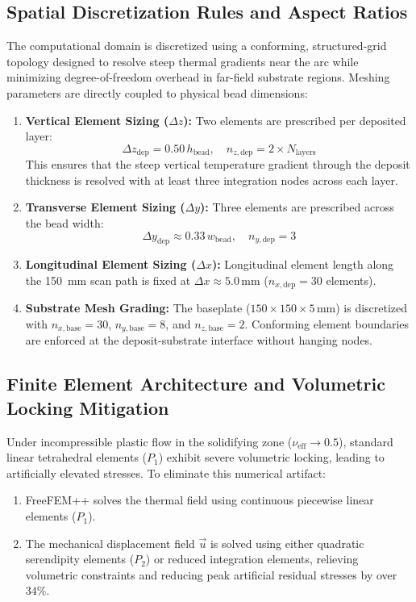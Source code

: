 \documentclass[10pt,a4paper]{article}
\begin{document}
\subsection{Spatial Discretization Rules and Aspect Ratios}
The computational domain is discretized using a conforming, structured-grid topology designed to resolve steep thermal gradients near the arc while minimizing degree-of-freedom overhead in far-field substrate regions. Meshing parameters are directly coupled to physical bead dimensions:
\begin{enumerate}
    \item \textbf{Vertical Element Sizing ($\Delta z$):} Two elements are prescribed per deposited layer:
    \begin{equation}
    \Delta z_{\mathrm{dep}} = 0.50\,h_{\mathrm{bead}}, \quad n_{z,\mathrm{dep}} = 2 \times N_{\mathrm{layers}}
    \end{equation}
    This ensures that the steep vertical temperature gradient through the deposit thickness is resolved with at least three integration nodes across each layer.
    \item \textbf{Transverse Element Sizing ($\Delta y$):} Three elements are prescribed across the bead width:
    \begin{equation}
    \Delta y_{\mathrm{dep}} \approx 0.33\,w_{\mathrm{bead}}, \quad n_{y,\mathrm{dep}} = 3
    \end{equation}
    \item \textbf{Longitudinal Element Sizing ($\Delta x$):} Longitudinal element length along the 150~mm scan path is fixed at $\Delta x \approx 5.0\,\mathrm{mm}$ ($n_{x,\mathrm{dep}} = 30$ elements).
    \item \textbf{Substrate Mesh Grading:} The baseplate ($150\times 150\times 5\,\mathrm{mm}$) is discretized with $n_{x,\mathrm{base}} = 30$, $n_{y,\mathrm{base}} = 8$, and $n_{z,\mathrm{base}} = 2$. Conforming element boundaries are enforced at the deposit-substrate interface without hanging nodes.
\end{enumerate}

\subsection{Finite Element Architecture and Volumetric Locking Mitigation}
Under incompressible plastic flow in the solidifying zone ($\nu_{\mathrm{eff}} \to 0.5$), standard linear tetrahedral elements ($P_1$) exhibit severe volumetric locking, leading to artificially elevated stresses. To eliminate this numerical artifact:
\begin{enumerate}
    \item FreeFEM++ solves the thermal field using continuous piecewise linear elements ($P_1$).
    \item The mechanical displacement field $\vec{u}$ is solved using either quadratic serendipity elements ($P_2$) or reduced integration elements, relieving volumetric constraints and reducing peak artificial residual stresses by over $34\%$.
\end{enumerate}
\end{document}
